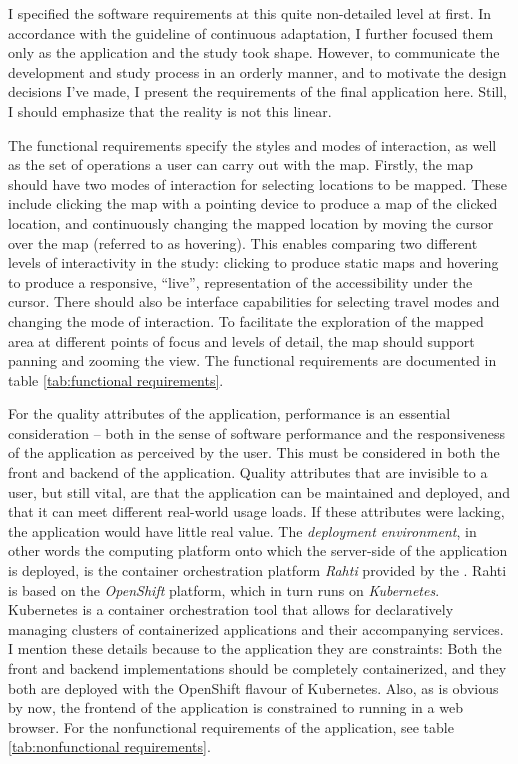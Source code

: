 I specified the software requirements at this quite non-detailed
level at first.
In accordance with the guideline of continuous adaptation,
\parencite{bec2001} I further focused them only as the application
and the study took shape.
However, to communicate the development and study process in an orderly manner,
and to motivate the design decisions I've made,
I present the requirements of the final application here.
Still, I should emphasize that the reality is not this linear.

The functional requirements specify the styles and modes of interaction,
as well as the set of operations a user can carry out with the map.
Firstly, the map should have two modes of interaction for selecting locations to be mapped.
These include clicking the map with a pointing device to produce a map of the clicked location,
and continuously changing the mapped location by moving the cursor over the map
(referred to as hovering).
This enables comparing two different levels of interactivity in the study:
clicking to produce static maps and hovering to produce
a responsive, \enquote{live},
representation of the accessibility under the cursor.
There should also be interface capabilities for selecting travel modes
and changing the mode of interaction.
To facilitate the exploration of the mapped area
at different points of focus and levels of detail,
the map should support panning and zooming the view.
The functional requirements are documented in table \ref{tab:functional requirements}.

For the quality attributes of the application,
performance is an essential consideration --
both in the sense of software performance
and the responsiveness of the application as perceived by the user.
This must be considered in both the front and backend of the application.
Quality attributes that are invisible to a user, but still vital,
are that the application can be maintained and deployed,
and that it can meet different real-world usage loads.
If these attributes were lacking,
the application would have little real value.
The \textit{deployment environment},
in other words the computing platform onto which the server-side of the application is deployed,
is the container orchestration platform \textit{Rahti} provided by the .
Rahti is based on the \textit{OpenShift} platform,
which in turn runs on \textit{Kubernetes}.
Kubernetes is a container orchestration tool
that allows for declaratively managing clusters
of containerized applications and their accompanying services.
I mention these details because to the application they are constraints:
Both the front and backend implementations should be completely containerized,
and they both are deployed with the OpenShift flavour of Kubernetes.
Also, as is obvious by now,
the frontend of the application is constrained to running in a web browser.
For the nonfunctional requirements of the application,
see table \ref{tab:nonfunctional requirements}.


